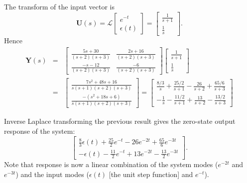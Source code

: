 \begin{slide}\label{slide:l4s14}
 The transform of the input vector is
\[\mathbf{U}(s) = \mathcal{L}\left[\begin{array}{c}
  e^{-t} \\
  \epsilon(t)
\end{array}\right] = \left[\begin{array}{c}
  \frac{1}{s+1} \\
  \frac{1}{s}
\end{array}\right].\] Hence
\begin{eqnarray*}\mathbf{Y}(s) &=& \left[\begin{array}{cc}
  \frac{5s+30}{(s+2)(s+3)} & \frac{2s+16}{(s+2)(s+3)} \\
   \frac{-s-12}{(s+2)(s+3)} & \frac{-6}{(s+2)(s+3)}
\end{array}\right]\left[\begin{array}{c}
  \frac{1}{s+1} \\
  \frac{1}{s}
\end{array}\right]\\
&=&\left[\begin{array}{c}
  \frac{7s^2+48s+16}{s(s+1)(s+2)(s+3)} \\
  \frac{-(s^2+18s+6)}{s(s+1)(s+2)(s+3)}
\end{array}\right] = \left[\begin{array}{c}
  \frac{8/3}{s}+\frac{25/2}{s+1}-\frac{26}{s+2}+\frac{65/6}{s+3} \\
   -\frac{1}{s}-\frac{11/2}{s+1}+\frac{13}{s+2}-\frac{13/2}{s+3}
\end{array}\right]
\end{eqnarray*}
\end{slide}
\begin{slide}\label{slide:l4s15}
 Inverse Laplace transforming the
previous result gives the zero-state output response of the
system: \[\left[\begin{array}{c}
  \frac{8}{3}\epsilon(t)+\frac{25}{2}e^{-t}-26e^{-2t}+\frac{65}{6}e^{-3t} \\
   -\epsilon(t)-\frac{11}{2}e^{-t}+13e^{-2t}-\frac{13}{2}e^{-3t}
\end{array}\right].\]
Note that response is now a linear combination of the system modes
($e^{-2t}$ and $e^{-3t}$) and the input modes ($\epsilon(t)$ [the
unit step function] and $e^{-t}$).
\end{slide}
